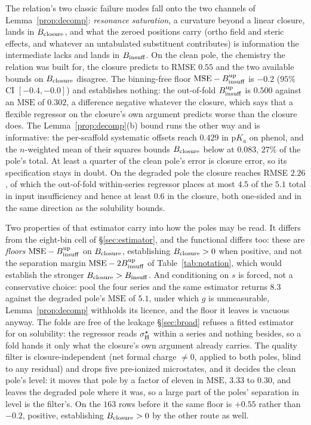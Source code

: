 The relation's two classic failure modes fall onto the two channels of Lemma~\ref{prop:decomp}:
\emph{resonance saturation}, a curvature beyond a linear closure, lands in $B_{\mathrm{closure}}$, and what the
zeroed positions carry (ortho field and steric effects, and whatever an untabulated substituent
contributes) is information the intermediate lacks and lands in $B_{\mathrm{insuff}}$. On the clean pole, the
chemistry the relation was built for, the closure predicts to RMSE $0.55$ and the two available
bounds on $B_{\mathrm{closure}}$ disagree. The binning-free floor $\mathrm{MSE}-B_{\mathrm{insuff}}^{\mathrm{up}}$ is $-0.2$
($95\%$ CI $[-0.4,-0.0]$) and establishes nothing: the out-of-fold $B_{\mathrm{insuff}}^{\mathrm{up}}$ is
$0.500$ against an $\mathrm{MSE}$ of $0.302$, a difference negative whatever the closure, which says
that a flexible regressor on the closure's own argument predicts worse than the closure does. The
Lemma~\ref{prop:decomp}(b) bound runs the other way and is informative: the per-scaffold systematic
offsets reach $0.429$ in $\mathrm pK_a$ on phenol, and the $n$-weighted mean of their squares bounds
$B_{\mathrm{closure}}$ below at $0.083$, $27\%$ of the pole's total. At least a quarter of the clean pole's error
is closure error, so its specification stays in doubt. On the degraded pole the closure reaches RMSE
$2.26$, of which the out-of-fold within-series regressor places at most $4.5$ of the $5.1$ total in
input insufficiency and hence at least $0.6$ in the closure, both one-sided and in the same
direction as the solubility bounds.

Two properties of that estimator carry into how the poles may be read. It differs from the eight-bin
cell of \S\ref{sec:estimator}, and the functional differs too: these are \emph{floors}
$\mathrm{MSE}-B_{\mathrm{insuff}}^{\mathrm{up}}$ on $B_{\mathrm{closure}}$, establishing $B_{\mathrm{closure}}>0$ when positive, and not the
separation margin $\mathrm{MSE}-2B_{\mathrm{insuff}}^{\mathrm{up}}$ of Table~\ref{tab:notation}, which would
establish the stronger $B_{\mathrm{closure}}>B_{\mathrm{insuff}}$. And conditioning on $s$ is forced, not a conservative
choice: pool the four series and the same estimator returns $8.3$ against the degraded pole's
$\mathrm{MSE}$ of $5.1$, under which $g$ is unmeasurable, Lemma~\ref{prop:decomp} withholds its
licence, and the floor it leaves is vacuous anyway. The folds are free of the leakage
\S\ref{sec:broad} refuses a fitted estimator for on solubility: the regressor reads
$\sigma_{\mathrm H}^\star$ within a series and nothing besides, so a fold hands it only what the closure's own
argument already carries. The quality filter is closure-independent (net formal charge $\neq0$,
applied to both poles, blind to any residual) and drops five pre-ionized microstates, and it decides
the clean pole's level: it moves that pole by a factor of eleven in $\mathrm{MSE}$, $3.33$ to
$0.30$, and leaves the degraded pole where it was, so a large part of the poles' separation in level
is the filter's. On the $163$ rows before it the same floor is $+0.55$ rather than $-0.2$, positive,
establishing $B_{\mathrm{closure}}>0$ by the other route as well.

